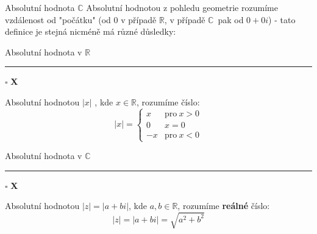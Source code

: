 \documentclass[aspectratio=169]{beamer} %
\newcommand{\ablock}[2]{\begin{alertblock}{#1 \hfill \rule{0.3cm}{0.4pt} \hspace{0.02cm} $\square$ \hspace{0.02cm} \textbf{X}} #2 \end{alertblock}}
\newcommand{\C}{$\mathbb{C}$}
\begin{document}
	\begin{frame}{Absolutní hodnota \C}
	Absolutní hodnotou z pohledu geometrie rozumíme vzdálenost od "počátku" (od $0$ v případě $\mathbb{R}$, v případě \C \ pak od $0+0i$) - tato definice je stejná nicméně má různé důsledky: \\
	 \begin{minipage}{0.48\textwidth}
	  \ablock{Absolutní hodnota v $\mathbb{R}$}{
	  Absolutní hodnotou $|x|$ , kde $x\in \mathbb{R}$, rozumíme číslo: \\
	  $$|x| = \begin{cases} x & \text{pro}\ x>0 \\ 0 & x=0 \\ -x & \text{pro}\ x<0 \end{cases}$$}
	 \end{minipage} 
	 \begin{minipage}{0.48\textwidth}
	  \ablock{Absolutní hodnota v \C}{
	   Absolutní hodnotou $|z|=|a+bi|$, kde $a,b \in \mathbb{R}$, rozumíme \textbf{reálné} číslo: $$|z|=|a+bi|=\sqrt{a^2+b^2}$$}
	 \end{minipage}
	\end{frame}
	
\end{document}
